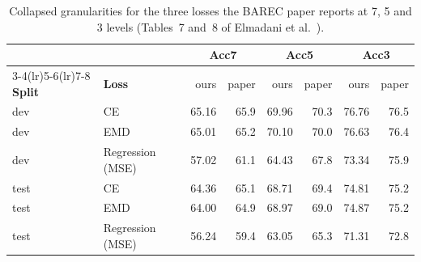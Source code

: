 \begin{table}[H]
\centering
\footnotesize
\caption{Collapsed granularities for the three losses the BAREC paper reports at 7, 5 and 3 levels (Tables~7 and~8 of Elmadani et al.~\cite{elmadani2025barec}).}
\label{tab:res-collapsed}
\begin{tabular}{llrrrrrr}
\toprule
& & \multicolumn{2}{c}{\textbf{Acc7}} & \multicolumn{2}{c}{\textbf{Acc5}} & \multicolumn{2}{c}{\textbf{Acc3}} \\
\cmidrule(lr){3-4}\cmidrule(lr){5-6}\cmidrule(lr){7-8}
\textbf{Split} & \textbf{Loss} & ours & paper & ours & paper & ours & paper \\
\midrule
dev & CE & 65.16 & 65.9 & 69.96 & 70.3 & 76.76 & 76.5 \\
dev & EMD & 65.01 & 65.2 & 70.10 & 70.0 & 76.63 & 76.4 \\
dev & Regression (MSE) & 57.02 & 61.1 & 64.43 & 67.8 & 73.34 & 75.9 \\
\midrule
test & CE & 64.36 & 65.1 & 68.71 & 69.4 & 74.81 & 75.2 \\
test & EMD & 64.00 & 64.9 & 68.97 & 69.0 & 74.87 & 75.2 \\
test & Regression (MSE) & 56.24 & 59.4 & 63.05 & 65.3 & 71.31 & 72.8 \\
\bottomrule
\end{tabular}
\end{table}
